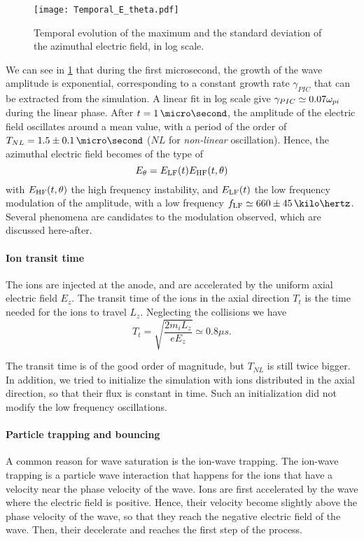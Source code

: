     \begin{figure}[!hbt]
      \centering
      \texttt{[image: Temporal\_E\_theta.pdf]}
      \caption{Temporal evolution of the maximum and the standard deviation of the azimuthal electric field, in log scale.}
      \label{fig-Ezstd_time}
    \end{figure}
    
    We can see in \cref{fig-Ezstd_time} that during the first microsecond, the growth of the wave amplitude is exponential, corresponding to a constant growth rate $\gamma_{PIC}$ that can be extracted from the simulation.
    A linear fit in log scale give $\gamma_{PIC} \simeq 0.07 \omega_{pi}$ during the linear phase.
    After $t=1\,\micro\second$, the amplitude of the electric field oscillates around a mean value, with a period of the order of $T_{NL}=1.5 \pm 0.1 \,\micro\second$ ($NL$ for {\it non-linear} oscillation).
    Hence, the azimuthal electric field becomes of the type of
    \[  E_{\theta} = E_{\rm LF}(t) E_{\rm HF}(t, {\theta}) \]
    with $E_{\rm HF}(t, \theta) $ the high frequency instability, and $E_{\rm LF}(t)$ the low frequency modulation of the amplitude, with a low frequency $f_{\rm LF} \simeq  660 \pm 45 \,\kilo\hertz$.
    Several phenomena are candidates to the modulation observed, which are discussed here-after.
    
  
  \paragraph{Ion transit time\\}
    The ions are injected at the anode, and are accelerated by the uniform axial electric field $E_z$.
    The transit time of the ions in the axial direction $T_t$  is the time needed for the ions to travel $L_z$. Neglecting the collisions we have
    \begin{equation} \label{eq-transittime}
      T_{t} = \sqrt{\frac{2 m_i L_z}{e E_z}} \simeq 0.8 \mu s.
    \end{equation}
    
    The transit time is of the good  order of magnitude, but $T_{NL}$ is still twice bigger.
    In addition, we tried to initialize the simulation with ions distributed in the axial direction, so that their flux is constant in time.
    Such an initialization did not modify the low frequency oscillations.
    
  \paragraph{Particle trapping and bouncing\\}
    A common reason for wave saturation is the ion-wave trapping.
    The ion-wave trapping is a particle wave interaction that happens for the ions that have a velocity near the phase velocity of the wave.
    Ions are first accelerated by the wave where the electric field is positive.
    Hence, their velocity become slightly above the phase velocity of the wave, so that they reach the negative electric field of the wave.
    Then, their decelerate and reaches the first step of the process. 
    
